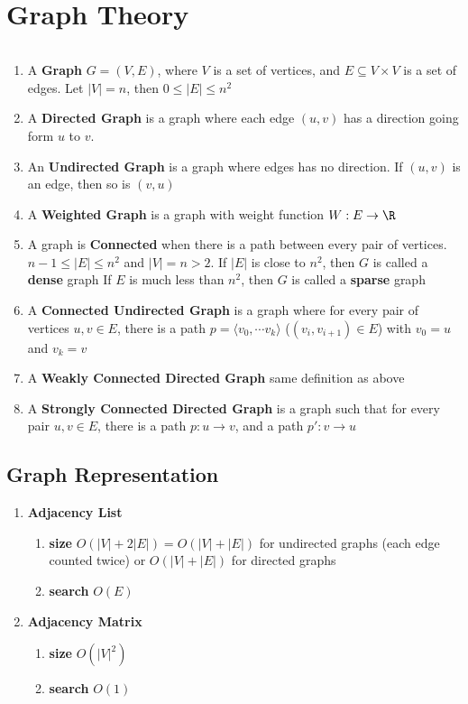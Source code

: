 \documentclass[11pt]{article}
\begin{document}
\section*{Graph Theory}


\begin{defn*}
  $ $\\
  \begin{enumerate}
    \item A \textbf{Graph} $G=(V, E)$, where $V$ is a set of vertices, and $E\subseteq  V\times V$ is a set of edges. Let $|V| = n$, then $0\leq |E| \leq n^2$
    \item A \textbf{Directed Graph} is a graph where each edge $(u, v)$ has a direction going form $u$ to $v$.
    \item An \textbf{Undirected Graph} is a graph where edges has no direction. If $(u,v)$ is an edge, then so is $(v,u)$
    \item A \textbf{Weighted Graph} is a graph with weight function $W: E \to \R$
    \item A graph is \textbf{Connected} when there is a path between every pair of vertices. $n-1 \leq |E| \leq n^2$ and $|V| = n > 2$. If $|E|$ is close to $n^2$, then $G$ is called a \textbf{dense} graph If $E$ is much less than $n^2$, then $G$ is called a \textbf{sparse} graph
    \item A \textbf{Connected Undirected Graph} is a graph where for every pair of vertices $u, v \in E$, there is a path $p=\langle v_0, \cdots v_k \rangle$ ($(v_i, v_{i+1})\in E$) with $v_0 = u$ and $v_k = v$
    \item A \textbf{Weakly Connected Directed Graph} same definition as above
    \item A \textbf{Strongly Connected Directed Graph} is a graph such that for every pair $u,v \in E$, there is a path $p: u\to v$, and a path $p': v\to u$
  \end{enumerate}
\end{defn*}

\subsection*{Graph Representation}

\begin{enumerate}
  \item \textbf{Adjacency List}
  \begin{enumerate}
    \item \textbf{size} $O(|V| + 2|E|) = O(|V| + |E|)$ for undirected graphs (each edge counted twice) or $O(|V| + |E|)$ for directed graphs
    \item \textbf{search} $O(E)$
  \end{enumerate}
  \item \textbf{Adjacency Matrix}
  \begin{enumerate}
    \item \textbf{size} $O(|V|^2)$
    \item \textbf{search} $O(1)$
  \end{enumerate}
\end{enumerate}
\end{document}
